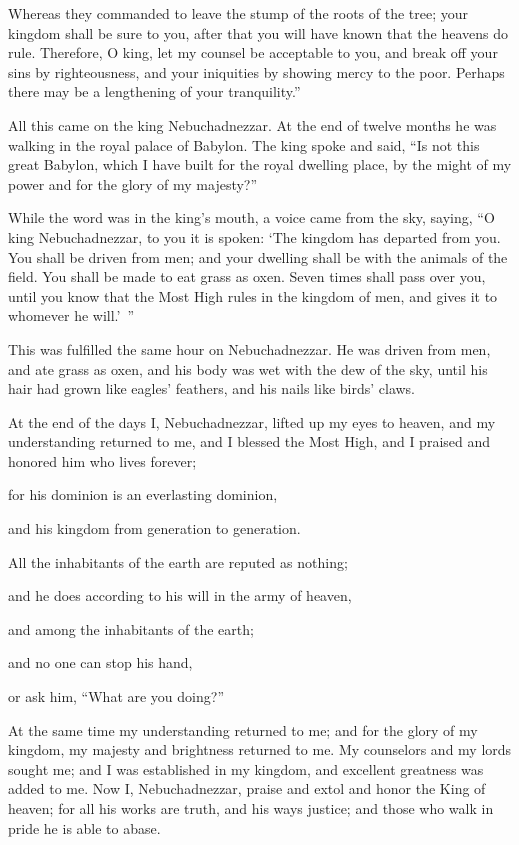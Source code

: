 {Whereas they commanded to leave the stump of the roots of the tree; your kingdom shall be sure to you, after that you will have known that the heavens do rule.
Therefore, O king, let my counsel be acceptable to you, and break off your sins by righteousness, and your iniquities by showing mercy to the poor. Perhaps there may be a lengthening of your tranquility.”
\par }{\PI {}All this came on the king Nebuchadnezzar.
At the end of twelve months he was walking in the royal palace of Babylon.
The king spoke and said, “Is not this great Babylon, which I have built for the royal dwelling place, by the might of my power and for the glory of my majesty?”
\par }{\PI {}While the word was in the king’s mouth, a voice came from the sky, saying, “O king Nebuchadnezzar, to you it is spoken: ‘The kingdom has departed from you.
You shall be driven from men; and your dwelling shall be with the animals of the field. You shall be made to eat grass as oxen. Seven times shall pass over you, until you know that the Most High rules in the kingdom of men, and gives it to whomever he will.’ ”
\par }{\PI {}This was fulfilled the same hour on Nebuchadnezzar. He was driven from men, and ate grass as oxen, and his body was wet with the dew of the sky, until his hair had grown like eagles’ feathers, and his nails like birds’ claws.
\par }{\PI {}At the end of the days I, Nebuchadnezzar, lifted up my eyes to heaven, and my understanding returned to me, and I blessed the Most High, and I praised and honored him who lives forever;
\par }{\Q for his dominion is an everlasting dominion,
\par }{\QB and his kingdom from generation to generation.
\par }{\Q {}All the inhabitants of the earth are reputed as nothing;
\par }{\QB and he does according to his will in the army of heaven,
\par }{\QB and among the inhabitants of the earth;
\par }{\Q and no one can stop his hand,
\par }{\QB or ask him, “What are you doing?”
\par }{\PI {}At the same time my understanding returned to me; and for the glory of my kingdom, my majesty and brightness returned to me. My counselors and my lords sought me; and I was established in my kingdom, and excellent greatness was added to me.
Now I, Nebuchadnezzar, praise and extol and honor the King of heaven; for all his works are truth, and his ways justice; and those who walk in pride he is able to abase.

}
